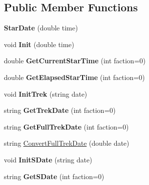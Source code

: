 \subsection*{Public Member Functions}
\begin{DoxyCompactItemize}
\item 
{\bfseries Star\+Date} (double time)\hypertarget{classStarDate_aab507694ee9dbcc0de624245d18269dd}{}\label{classStarDate_aab507694ee9dbcc0de624245d18269dd}

\item 
void {\bfseries Init} (double time)\hypertarget{classStarDate_a253a5fa31268ec8bfac1ed6e0887ee8f}{}\label{classStarDate_a253a5fa31268ec8bfac1ed6e0887ee8f}

\item 
double {\bfseries Get\+Current\+Star\+Time} (int faction=0)\hypertarget{classStarDate_a18340a3d0fc4a0cfc3de8d7005820296}{}\label{classStarDate_a18340a3d0fc4a0cfc3de8d7005820296}

\item 
double {\bfseries Get\+Elapsed\+Star\+Time} (int faction=0)\hypertarget{classStarDate_aa6cf40015a241c3ee21aac95aef6f639}{}\label{classStarDate_aa6cf40015a241c3ee21aac95aef6f639}

\item 
void {\bfseries Init\+Trek} (string date)\hypertarget{classStarDate_ae5788b0dbcde99ba399cdad635735bbf}{}\label{classStarDate_ae5788b0dbcde99ba399cdad635735bbf}

\item 
string {\bfseries Get\+Trek\+Date} (int faction=0)\hypertarget{classStarDate_ad4f2e5a535371f03400d5d3e7ca5ff9d}{}\label{classStarDate_ad4f2e5a535371f03400d5d3e7ca5ff9d}

\item 
string {\bfseries Get\+Full\+Trek\+Date} (int faction=0)\hypertarget{classStarDate_ae3b3911e446f706a818c5c8f7eb818ae}{}\label{classStarDate_ae3b3911e446f706a818c5c8f7eb818ae}

\item 
string \hyperlink{classStarDate_ab966a843a62847f755c1de5fe6c7d5ec}{Convert\+Full\+Trek\+Date} (double date)
\item 
void {\bfseries Init\+S\+Date} (string date)\hypertarget{classStarDate_a99b4bc2ef610d5e386f8b459bbdd5862}{}\label{classStarDate_a99b4bc2ef610d5e386f8b459bbdd5862}

\item 
string {\bfseries Get\+S\+Date} (int faction=0)\hypertarget{classStarDate_aa45f582c8067053703078847ccd0721b}{}\label{classStarDate_aa45f582c8067053703078847ccd0721b}


\end{DoxyCompactItemize}
